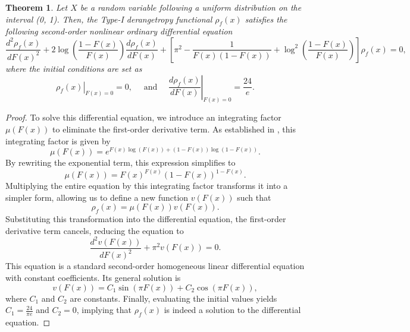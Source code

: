 \documentclass[sn-mathphys-num]{sn-jnl}%
\theoremstyle{thmstyleone}%
\newtheorem{theorem}{Theorem}%
\theoremstyle{thmstyletwo}%
\theoremstyle{thmstylethree}%
\begin{document}
\begin{theorem}
	Let $X$ be a random variable following a uniform distribution on the interval (0, 1). Then, the Type-I derangetropy functional $\rho_f(x)$ satisfies the following {\color{black}second-order nonlinear ordinary differential equation}
	\begin{equation} \frac{d^2 \rho_f(x)}{d F(x)^2} + 2 \log \left(\frac{1 - F(x)}{F(x)}\right) \frac{d \rho_f(x)}{d F(x)} + \left[\pi^2 - \frac{1}{F(x)(1 - F(x))} + \log^2 \left(\frac{1 - F(x)}{F(x)}\right) \right] \rho_f(x) = 0, \end{equation}
	where the initial conditions are set as
	$$
	\left.\rho_f(x)\right|_{F(x)=0}=0, \quad \text { and }\left.\quad \frac{d \rho_f(x)}{d F(x)}\right|_{F(x)=0}=\frac{24}{e}.
	$$
\end{theorem}
\begin{proof}
	To solve this differential equation, we introduce an integrating factor $\mu(F(x))$ to eliminate the first-order derivative term. As established in \cite{ataei2024derangetropy}, this integrating factor is given by	
	\begin{equation}
		\mu(F(x))=e^{F(x)\log(F(x)) + (1-F(x))\log(1-F(x))}.
	\end{equation}	
	By rewriting the exponential term, this expression simplifies to
	\begin{equation}
		\mu(F(x))=F(x)^{F(x)}(1-F(x))^{1-F(x)} .
	\end{equation}	
	Multiplying the entire equation by this integrating factor transforms it into a simpler form, allowing us to define a new function $v(F(x))$ such that	
	\begin{equation}
		\rho_f(x)=\mu(F(x)) v(F(x)).
	\end{equation}	
	Substituting this transformation into the differential equation, the first-order derivative term cancels, reducing the equation to	
	\begin{equation}
		\frac{d^2 v(F(x))}{d F(x)^2}+\pi^2 v(F(x))=0 .
	\end{equation}
	This equation is a standard second-order homogeneous linear differential equation with constant coefficients. Its general solution is	
	\begin{equation}
		v(F(x))=C_1 \sin (\pi F(x))+C_2 \cos (\pi F(x)),
	\end{equation}	
	where $C_1$ and $C_2$ are constants. Finally, evaluating the initial values yields $C_1=\frac{24}{\pi e}$ and $C_2=0$, implying that $\rho_f(x)$ is indeed a solution to the differential equation.
\end{proof}
\end{document}
